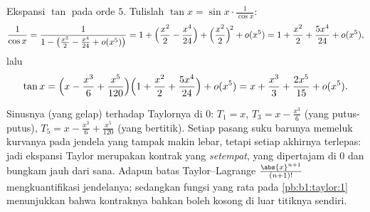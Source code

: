 \begin{example}\label{ex:b1:taylor:tan}
Ekspansi $\tan$ pada orde $5$. Tulislah $\tan x =
\sin x \cdot \frac{1}{\cos x}$:
\[
\frac{1}{\cos x} = \frac{1}{1 - \bigl(\frac{x^2}{2} - \frac{x^4}{24}
+ o(x^5)\bigr)}
= 1 + \Bigl(\frac{x^2}{2} - \frac{x^4}{24}\Bigr)
+ \Bigl(\frac{x^2}{2}\Bigr)^{\!2} + o(x^5)
= 1 + \frac{x^2}{2} + \frac{5x^4}{24} + o(x^5),
\]
lalu
\[
\tan x = \Bigl(x - \frac{x^3}{6} + \frac{x^5}{120}\Bigr)
\Bigl(1 + \frac{x^2}{2} + \frac{5x^4}{24}\Bigr) + o(x^5)
= x + \frac{x^3}{3} + \frac{2x^5}{15} + o(x^5) .
\]
\end{example}

\begin{omfigure}

{\small Sinusnya (yang gelap) terhadap  Taylornya di $0$:
$T_1 = x$, $T_3 = x - \frac{x^3}{6}$ (yang putus-putus), $T_5 = x -
\frac{x^3}{6} + \frac{x^5}{120}$ (yang bertitik). Setiap pasang suku barunya
memeluk kurvanya pada jendela yang tampak makin lebar, tetapi setiap 
akhirnya terlepas: jadi ekspansi Taylor merupakan kontrak yang
\emph{setempat}, yang dipertajam di $0$ dan bungkam jauh dari sana. Adapun
batas Taylor--Lagrange $\frac{\abs{x}^{n+1}}{(n+1)!}$ mengkuantifikasi
jendelanya; sedangkan fungsi yang rata pada \cref{pb:b1:taylor:1} menunjukkan bahwa
kontraknya bahkan boleh kosong di luar titiknya sendiri.}
\end{omfigure}

